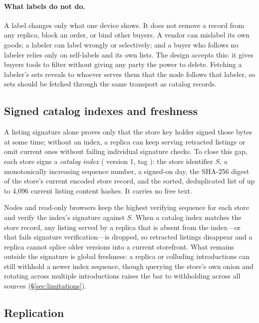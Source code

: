 \paragraph{What labels do not do.} A label changes only what one device shows. It does not remove a record from any replica, block an order, or bind other buyers. A vendor can mislabel its own goods; a labeler can label wrongly or selectively; and a buyer who follows no labeler relies only on self-labels and its own lists. The design accepts this: it gives buyers tools to filter without giving any party the power to delete. Fetching a labeler's sets reveals to whoever serves them that the node follows that labeler, so sets should be fetched through the same transport as catalog records.

\subsection{Signed catalog indexes and freshness}
\label{sec:catalog-index}

A listing signature alone proves only that the store key holder signed those bytes at some time; without an index, a replica can keep serving retracted listings or omit current ones without failing individual signature checks. To close this gap, each store signs a \emph{catalog index} ( version 1, tag ): the store identifier $S$, a monotonically increasing sequence number, a signed-on day, the SHA-256 digest of the store's current encoded store record, and the sorted, deduplicated list of up to 4{,}096 current listing content hashes. It carries no free text.

Nodes and read-only browsers keep the highest verifying sequence for each store and verify the index's signature against $S$. When a catalog index matches the store record, any listing served by a replica that is absent from the index---or that fails signature verification---is dropped, so retracted listings disappear and a replica cannot splice older versions into a current storefront. What remains outside the signature is global freshness: a replica or colluding introductions can still withhold a newer index sequence, though querying the store's own onion and rotating across multiple introductions raises the bar to withholding across all sources (\S\ref{sec:limitations}).

\subsection{Replication}

